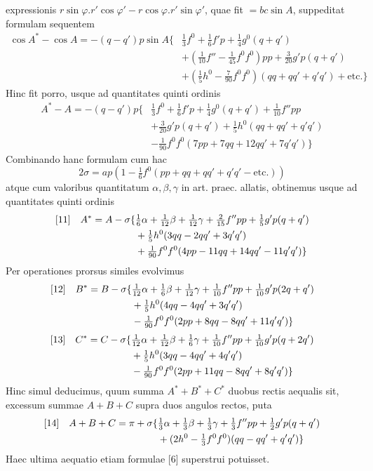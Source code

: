 %
expressionis \(r\sin\varphi\mathord{.}r'\cos\varphi'-r\cos\varphi\mathord{.}r'\sin\varphi'\), quae fit \(=bc\sin A\), suppeditat formulam sequentem
\[
\begin{aligned}
\cos A^*-\cos A=-(q-q')p\sin A\{&\tfrac{1}{3}f^0+\tfrac{1}{6}f'p+\tfrac{1}{4}g^0(q+q')\\
&+(\tfrac{1}{10}f''-\tfrac{1}{45}f^0f^0)pp+\tfrac{3}{20}g'p(q+q')\\
&+(\tfrac{1}{5}h^0-\tfrac{7}{90}f^0f^0)(qq+qq'+q'q')+\text{etc.}\}
\end{aligned}
\]
Hinc fit porro, usque ad quantitates quinti ordinis
\[
\begin{aligned}
A^*-A=-(q-q')p\{&\tfrac{1}{3}f^0+\tfrac{1}{6}f'p+\tfrac{1}{4}g^0(q+q')+\tfrac{1}{10}f''pp\\
&+\tfrac{3}{20}g'p(q+q')+\tfrac{1}{5}h^0(qq+qq'+q'q')\\
&-\tfrac{1}{90}f^0f^0(7pp+7qq+12qq'+7q'q')\}
\end{aligned}
\]
Combinando hanc formulam cum hac
\[
2\sigma=ap(1-\tfrac{1}{6}f^0(pp+qq+qq'+q'q'-\text{etc.}))
\]
atque cum valoribus quantitatum \(\alpha,\beta,\gamma\) in art. praec. allatis, obtinemus usque ad quantitates quinti ordinis
\[
\begin{aligned}
\relax[11]\quad A^*=A-\sigma\{&\tfrac{1}{6}\alpha+\tfrac{1}{12}\beta+\tfrac{1}{12}\gamma+\tfrac{2}{15}f''pp+\tfrac{1}{5}g'p(q+q')\\
&+\tfrac{1}{5}h^0(3qq-2qq'+3q'q')\\
&+\tfrac{1}{90}f^0f^0(4pp-11qq+14qq'-11q'q')\}
\end{aligned}
\]
Per operationes prorsus similes evolvimus
\[
\begin{aligned}
\relax[12]\quad B^*=B-\sigma\{&\tfrac{1}{12}\alpha+\tfrac{1}{6}\beta+\tfrac{1}{12}\gamma+\tfrac{1}{10}f''pp+\tfrac{1}{10}g'p(2q+q')\\
&+\tfrac{1}{5}h^0(4qq-4qq'+3q'q')\\
&-\tfrac{1}{90}f^0f^0(2pp+8qq-8qq'+11q'q')\}
\end{aligned}
\]
\[
\begin{aligned}
\relax[13]\quad C^*=C-\sigma\{&\tfrac{1}{12}\alpha+\tfrac{1}{12}\beta+\tfrac{1}{6}\gamma+\tfrac{1}{10}f''pp+\tfrac{1}{10}g'p(q+2q')\\
&+\tfrac{1}{5}h^0(3qq-4qq'+4q'q')\\
&-\tfrac{1}{90}f^0f^0(2pp+11qq-8qq'+8q'q')\}
\end{aligned}
\]
Hinc simul deducimus, quum summa \(A^*+B^*+C^*\) duobus rectis aequalis sit, excessum summae \(A+B+C\) supra duos angulos rectos, puta
\[
\begin{aligned}
\relax[14]\quad A+B+C=\pi+\sigma\{&\tfrac{1}{3}\alpha+\tfrac{1}{3}\beta+\tfrac{1}{3}\gamma+\tfrac{1}{3}f''pp+\tfrac{1}{2}g'p(q+q')\\
&+(2h^0-\tfrac{1}{3}f^0f^0)(qq-qq'+q'q')\}
\end{aligned}
\]
Haec ultima aequatio etiam formulae [6] superstrui potuisset.

